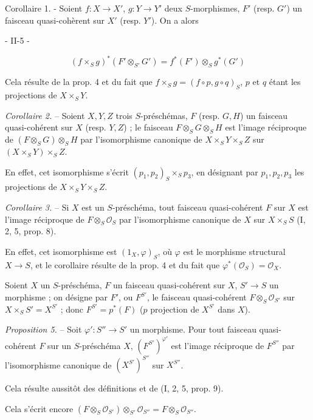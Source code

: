 Corollaire 1. - Soient $f : X \to X'$, $g : Y \to Y'$ deux $S$-morphismes, $F'$ (resp. $G'$) un faisceau quasi-cohèrent sur $X'$ (resp. $Y'$). On a alors

\newpage


- II-5 -

$$(f \times_S g)^*(F' \otimes_{S'} G') = f^*(F') \otimes_S g^*(G')$$

Cela résulte de la prop. 4 et du fait que $f \times_S g = (f \circ p, g \circ q)_S$, $p$ et $q$ étant les projections de $X \times_S Y$.

\noindent \textit{Corollaire 2.} -- Soient $X, Y, Z$ trois $S$-préschémas, $F$ (resp. $G, H$) un faisceau quasi-cohérent sur $X$ (resp. $Y, Z$) ; le faisceau $F \otimes_S G \otimes_S H$ est l'image réciproque de $(F \otimes_S G) \otimes_S H$ par l'isomorphisme canonique de $X \times_S Y \times_S Z$ sur $(X \times_S Y) \times_S Z$.

En effet, cet isomorphisme s'écrit $(p_1, p_2)_S \times_S p_3$, en désignant par $p_1, p_2, p_3$ les projections de $X \times_S Y \times_S Z$.

\noindent \textit{Corollaire 3.} -- Si $X$ est un $S$-préschéma, tout faisceau quasi-cohérent $F$ sur $X$ est l'image réciproque de $F \otimes_S \mathcal{O}_S$ par l'isomorphisme canonique de $X$ sur $X \times_S S$ (I, 2, 5, prop. 8).

En effet, cet isomorphisme est $(1_X, \varphi)_S$, où $\varphi$ est le morphisme structural $X \to S$, et le corollaire résulte de la prop. 4 et du fait que $\varphi^*(\mathcal{O}_S) = \mathcal{O}_X$.

Soient $X$ un $S$-préschéma, $F$ un faisceau quasi-cohérent sur $X$, $S' \to S$ un morphisme ; on désigne par $F'$, ou $F^{S'}$, le faisceau quasi-cohérent $F \otimes_S \mathcal{O}_{S'}$ sur $X \times_S S' = X^{S'}$ ; donc $F^{S'} = p^*(F)$ ($p$ projection de $X^{S'}$ dans $X$).

\noindent \textit{Proposition 5.} -- Soit $\varphi' : S'' \to S'$ un morphisme. Pour tout faisceau quasi-cohérent $F$ sur un $S$-préschéma $X$, $(F^{S'})^{\varphi'}$ est l'image réciproque de $F^{S''}$ par l'isomorphisme canonique de $(X^{S'})^{S''}$ sur $X^{S''}$.

Cela résulte aussitôt des définitions et de (I, 2, 5, prop. 9).

Cela s'écrit encore $(F \otimes_S \mathcal{O}_{S'}) \otimes_{S'} \mathcal{O}_{S''} = F \otimes_S \mathcal{O}_{S''}$.

